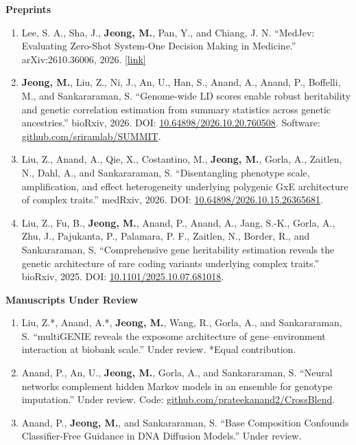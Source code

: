 \documentclass[10pt,letterpaper]{article}
\begin{document}
\textbf{Preprints}
\begin{enumerate}[resume]
\item Lee, S. A., Sha, J., \textbf{Jeong, M.}, Pan, Y., and Chiang, J. N. ``MedJev: Evaluating Zero-Shot System-One Decision Making in Medicine.'' arXiv:2610.36006, 2026. \href{https://arxiv.org/abs/2610.36006}{[link]}
\item \textbf{Jeong, M.}, Liu, Z., Ni, J., An, U., Han, S., Anand, A., Anand, P., Boffelli, M., and Sankararaman, S. ``Genome-wide LD scores enable robust heritability and genetic correlation estimation from summary statistics across genetic ancestries.'' bioRxiv, 2026. DOI: \href{https://doi.org/10.64898/2026.10.20.760508}{10.64898/2026.10.20.760508}. Software: \href{https://github.com/sriramlab/SUMMIT}{github.com/sriramlab/SUMMIT}.
\item Liu, Z., Anand, A., Qie, X., Costantino, M., \textbf{Jeong, M.}, Gorla, A., Zaitlen, N., Dahl, A., and Sankararaman, S. ``Disentangling phenotype scale, amplification, and effect heterogeneity underlying polygenic GxE architecture of complex traits.'' medRxiv, 2026. DOI: \href{https://doi.org/10.64898/2026.10.15.26365681}{10.64898/2026.10.15.26365681}.
\item Liu, Z., Fu, B., \textbf{Jeong, M.}, Anand, P., Anand, A., Jang, S.-K., Gorla, A., Zhu, J., Pajukanta, P., Palamara, P. F., Zaitlen, N., Border, R., and Sankararaman, S. ``Comprehensive gene heritability estimation reveals the genetic architecture of rare coding variants underlying complex traits.'' bioRxiv, 2025. DOI: \href{https://doi.org/10.1101/2025.10.07.681018}{10.1101/2025.10.07.681018}.
\end{enumerate}

\textbf{Manuscripts Under Review}
\begin{enumerate}[resume]
\item Liu, Z.*, Anand, A.*, \textbf{Jeong, M.}, Wang, R., Gorla, A., and Sankararaman, S. ``multiGENIE reveals the exposome architecture of gene--environment interaction at biobank scale.'' Under review. *Equal contribution.
\item Anand, P., An, U., \textbf{Jeong, M.}, Gorla, A., and Sankararaman, S. ``Neural networks complement hidden Markov models in an ensemble for genotype imputation.'' Under review. Code: \href{https://github.com/prateekanand2/CrossBlend}{github.com/prateekanand2/CrossBlend}.
\item Anand, P., \textbf{Jeong, M.}, and Sankararaman, S. ``Base Composition Confounds Classifier-Free Guidance in DNA Diffusion Models.'' Under review.
\end{enumerate}
\end{document}
